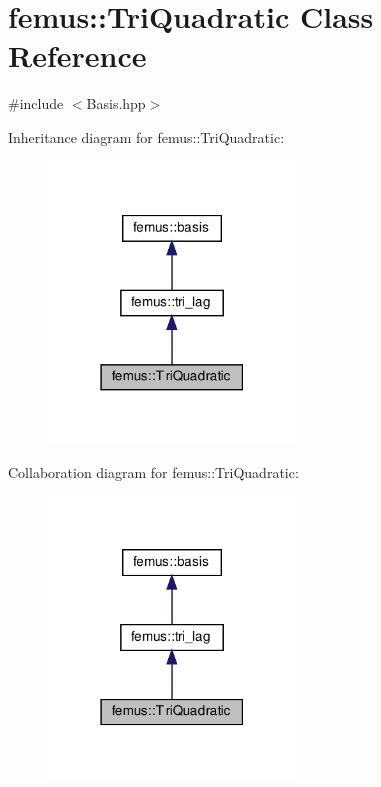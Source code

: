 \hypertarget{classfemus_1_1_tri_quadratic}{}\section{femus\+:\+:Tri\+Quadratic Class Reference}
\label{classfemus_1_1_tri_quadratic}


{\ttfamily \#include $<$Basis.\+hpp$>$}



Inheritance diagram for femus\+:\+:Tri\+Quadratic\+:
\nopagebreak
\begin{figure}[H]
\begin{center}
\leavevmode
\includegraphics[width=186pt]{classfemus_1_1_tri_quadratic__inherit__graph}
\end{center}
\end{figure}


Collaboration diagram for femus\+:\+:Tri\+Quadratic\+:
\nopagebreak
\begin{figure}[H]
\begin{center}
\leavevmode
\includegraphics[width=186pt]{classfemus_1_1_tri_quadratic__coll__graph}
\end{center}
\end{figure}
